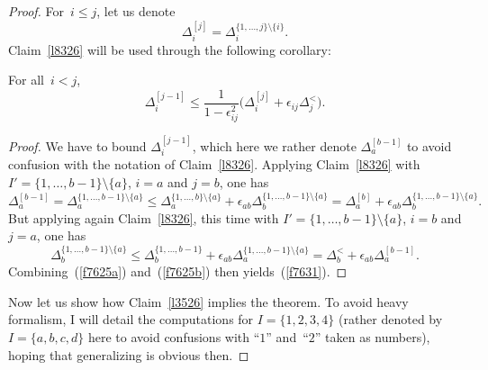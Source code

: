 \begin{proof}
For~$i \leq j$, let us denote
\[ \Delta^{[j]}_i = \Delta^{\{1,\ldots,j\} \setminus \{i\}}_i .\]
Claim~\ref{l8326} will be used through the following corollary:
\begin{Clm}\label{l3526}
For all~$i<j$,
\[\label{f7631} \Delta^{[j-1]}_i \leq \frac{1}{1-\epsilon_{ij}^2}
\big( \Delta^{[j]}_i + \epsilon_{ij} \Delta^{<}_j \big) .\]
\end{Clm}

\begin{proof}
We have to bound $\Delta^{[j-1]}_i$, which here we rather denote
$\Delta^{[b-1]}_a$ to avoid confusion with the notation of Claim~\ref{l8326}.
Applying Claim~\ref{l8326} with $I' = \{1,\ldots,b-1\} \setminus \{a\}$,
$i = a$ and $j = b$, one has
\[\label{f7625a} \Delta^{[b-1]}_a = \Delta^{\{1,\ldots,b-1\}\setminus\{a\}}_{a}
\leq \Delta^{\{1,\ldots,b\}\setminus\{a\}}_{a}
+ \epsilon_{ab} \Delta^{\{1,\ldots,b-1\}\setminus\{a\}}_b
= \Delta^{[b]}_{a} + \epsilon_{ab} \Delta^{\{1,\ldots,b-1\}\setminus\{a\}}_b .\]
But applying again Claim~\ref{l8326}, this time with $I' = \{1,\ldots,b-1\} \setminus \{a\}$,
$i = b$ and $j = a$, one has
\[\label{f7625b} \Delta^{\{1,\ldots,b-1\}\setminus\{a\}}_{b}
\leq \Delta^{\{1,\ldots,b-1\}}_{b}
+ \epsilon_{ab} \Delta^{\{1,\ldots,b-1\}\setminus\{a\}}_a
= \Delta^{<}_b + \epsilon_{ab} \Delta^{[b-1]}_a .\]
Combining~(\ref{f7625a}) and~(\ref{f7625b}) then yields~(\ref{f7631}).
\end{proof}

Now let us show how Claim~\ref{l3526} implies the theorem.
To avoid heavy formalism, I will detail the computations for $I = \{1,2,3,4\}$
(rather denoted by~$I = \{a,b,c,d\}$ here to avoid confusions
with ``$1$'' and~``$2$'' taken as numbers),
hoping that generalizing is obvious then.


\end{proof}
